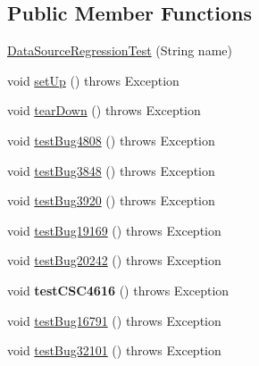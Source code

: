 \subsection*{Public Member Functions}
\begin{DoxyCompactItemize}
\item 
\mbox{\hyperlink{classtestsuite_1_1regression_1_1_data_source_regression_test_ab2c694d826548de54ca0b8397a78293c}{Data\+Source\+Regression\+Test}} (String name)
\item 
void \mbox{\hyperlink{classtestsuite_1_1regression_1_1_data_source_regression_test_a0f701712ab1a3a10727059063fee1ece}{set\+Up}} ()  throws Exception 
\item 
void \mbox{\hyperlink{classtestsuite_1_1regression_1_1_data_source_regression_test_a8832a43271bfaaf86c320113cf001ecd}{tear\+Down}} ()  throws Exception 
\item 
void \mbox{\hyperlink{classtestsuite_1_1regression_1_1_data_source_regression_test_a549c69563bb8fff0dbc64c72d6867f69}{test\+Bug4808}} ()  throws Exception 
\item 
void \mbox{\hyperlink{classtestsuite_1_1regression_1_1_data_source_regression_test_a8996aec86e7e81696fa451b9d9b457f2}{test\+Bug3848}} ()  throws Exception 
\item 
void \mbox{\hyperlink{classtestsuite_1_1regression_1_1_data_source_regression_test_ac91c1a6dd9a345d051941b69a3193e57}{test\+Bug3920}} ()  throws Exception 
\item 
void \mbox{\hyperlink{classtestsuite_1_1regression_1_1_data_source_regression_test_a9ef6137b8f62a30be45c74a81be1d299}{test\+Bug19169}} ()  throws Exception 
\item 
void \mbox{\hyperlink{classtestsuite_1_1regression_1_1_data_source_regression_test_a59191cb9aeb387f68d1d484356d9c744}{test\+Bug20242}} ()  throws Exception 
\item 
\mbox{\label{classtestsuite_1_1regression_1_1_data_source_regression_test_a151cb2069ead1819a419cadc6e3e126b}} 
void {\bfseries test\+C\+S\+C4616} ()  throws Exception 
\item 
void \mbox{\hyperlink{classtestsuite_1_1regression_1_1_data_source_regression_test_af69d51f59966174507009b456bcc4ef3}{test\+Bug16791}} ()  throws Exception 
\item 
void \mbox{\hyperlink{classtestsuite_1_1regression_1_1_data_source_regression_test_afbc8307057c46d97d66b67f78f567cb5}{test\+Bug32101}} ()  throws Exception 

\end{DoxyCompactItemize}
